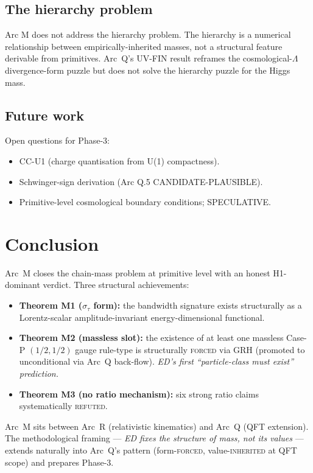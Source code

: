 \documentclass[11pt,a4paper]{article}
\begin{document}
\subsection{The hierarchy problem}

Arc M does not address the hierarchy problem. The hierarchy is a numerical relationship between empirically-inherited masses, not a structural feature derivable from primitives. Arc~Q's UV-FIN result reframes the cosmological-$\Lambda$ divergence-form puzzle but does not solve the hierarchy puzzle for the Higgs mass.

\subsection{Future work}

Open questions for Phase-3:
\begin{itemize}
  \item CC-U1 (charge quantisation from U(1) compactness).
  \item Schwinger-sign derivation (Arc Q.5 CANDIDATE-PLAUSIBLE).
  \item Primitive-level cosmological boundary conditions; SPECULATIVE.
\end{itemize}

\section{Conclusion}

Arc~M closes the chain-mass problem at primitive level with an honest H1-dominant verdict. Three structural achievements:
\begin{itemize}
  \item \textbf{Theorem M1 ($\sigma_\tau$ form):} the bandwidth signature exists structurally as a Lorentz-scalar amplitude-invariant energy-dimensional functional.
  \item \textbf{Theorem M2 (massless slot):} the existence of at least one massless Case-P $(1/2, 1/2)$ gauge rule-type is structurally \textsc{forced} via GRH (promoted to unconditional via Arc~Q back-flow). \emph{ED's first ``particle-class must exist'' prediction.}
  \item \textbf{Theorem M3 (no ratio mechanism):} six strong ratio claims systematically \textsc{refuted}.
\end{itemize}

Arc~M sits between Arc~R (relativistic kinematics) and Arc~Q (QFT extension). The methodological framing --- \emph{ED fixes the structure of mass, not its values} --- extends naturally into Arc~Q's pattern (form-\textsc{forced}, value-\textsc{inherited} at QFT scope) and prepares Phase-3.
\end{document}
